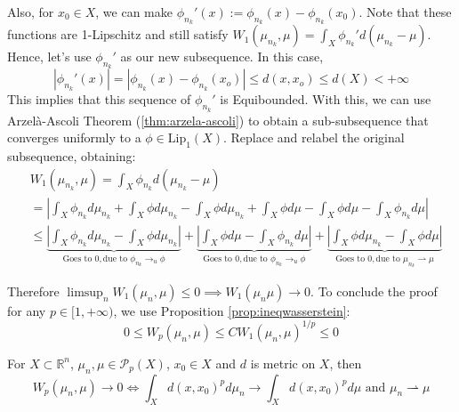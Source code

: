 \begin{prf}
  Also, for $x_0 \in X$, we can make $\phi_{n_k}'(x):= \phi_{n_k}(x) - \phi_{n_k}(x_0)$. Note that these functions are
  1-Lipschitz and still satisfy
  $W_1(\mu_{n_k},\mu) = \int_X \phi_{n_k}'d(\mu_{n_k}-\mu)$. Hence, let's use $\phi_{n_k}'$ as our new subsequence.
  In this case,
  \begin{equation*}
    |\phi_{n_k}'(x)| =
    |\phi_{n_k}(x) - \phi_{n_k}(x_o)|
    \leq d(x,x_o) \leq d(X) <+\infty
  \end{equation*}
  This implies that this sequence of $\phi_{n_k}'$ is Equibounded.
  With this, we can use Arzelà-Ascoli Theorem (\ref{thm:arzela-ascoli})
  to obtain a sub-subsequence that converges uniformly to a $\phi \in \text{Lip}_1(X)$.
  Replace and relabel the original subsequence, obtaining:
  \begin{align*}
     & W_1(\mu_{n_k},\mu) = \int_X \phi_{n_k}d(\mu_{n_k}-\mu) \\
     & =
    \left|
    \int_X \phi_{n_k}d\mu_{n_k}+
    \int_X \phi d\mu_{n_k} -
    \int_X \phi d\mu_{n_k} +
    \int_X \phi d\mu -
    \int_X \phi d\mu -
    \int_X \phi_{n_k}d\mu
    \right|                                                        \\
     & \leq
    \underbrace{
      \left|
      \int_X \phi_{n_k}d\mu_{n_k} -
      \int_X \phi d\mu_{n_k}
      \right|}
    _{\text{Goes to }0, \text{due to } \phi_{n_k}\to_u \phi}+
    \underbrace{
      \left|
      \int_X \phi d\mu-
      \int_X \phi_{n_k} d\mu
      \right|}
    _{\text{Goes to }0, \text{due to } \phi_{n_k}\to_u \phi}+
    \underbrace{
      \left|
      \int_X \phi d\mu_{n_k} -
      \int_X \phi d\mu
      \right|}
    _{\text{Goes to }0, \text{due to } \mu_{n_k}\rightharpoonup \mu}
  \end{align*}

  Therefore $\limsup_n W_1(\mu_n,\mu) \leq 0 \implies W_1(\mu_n\mu) \to 0$. To conclude the proof
  for any $p \in [1,+\infty)$, we use Proposition \ref{prop:ineqwasserstein}:
  \begin{equation*}
    0 \leq W_p(\mu_n,\mu) \leq CW_1(\mu_n,\mu)^{1/p} \leq 0
  \end{equation*}
\end{prf}

\begin{theorem}
  For $X \subset \mathbb R^n$, $\mu_n,\mu \in \mathcal P_p(X)$, $x_0 \in X$ and
  $d$ is metric on $X$, then
  \begin{equation}
    W_p(\mu_n,\mu) \to 0 \iff \int_X d(x,x_0)^p d\mu_n \to \int_X d(x,x_0)^p d\mu
    \text{ and } \mu_n \rightharpoonup \mu
  \end{equation}
  \label{thm:convwasserstein}
\end{theorem}

